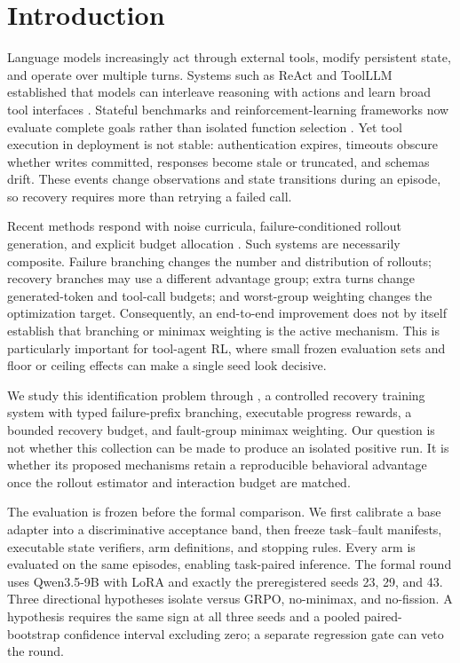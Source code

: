 \section{Introduction}
\label{sec:introduction}

Language models increasingly act through external tools, modify persistent
state, and operate over multiple turns.  Systems such as ReAct and ToolLLM
established that models can interleave reasoning with actions and learn broad
tool interfaces \citep{yao2023react,qin2024toolllm}.  Stateful benchmarks and
reinforcement-learning frameworks now evaluate complete goals rather than
isolated function selection
\citep{yao2024taubench,barres2025tau2bench,jiang2025verltool,chai2025rlfactory,xi2025agentgymrl}.
Yet tool execution in deployment is not stable: authentication expires,
timeouts obscure whether writes committed, responses become stale or
truncated, and schemas drift.  These events change observations and state
transitions during an episode, so recovery requires more than retrying a
failed call.

Recent methods respond with noise curricula, failure-conditioned rollout
generation, and explicit budget allocation
\citep{chen2026noisyagent,zhang2026fissiongrpo,hu2026infotree}.  Such systems
are necessarily composite.  Failure branching changes the number and
distribution of rollouts; recovery branches may use a different advantage
group; extra turns change generated-token and tool-call budgets; and
worst-group weighting changes the optimization target.  Consequently, an
end-to-end improvement does not by itself establish that branching or
minimax weighting is the active mechanism.  This is particularly important
for tool-agent RL, where small frozen evaluation sets and floor or ceiling
effects can make a single seed look decisive.

We study this identification problem through \method{}, a controlled recovery
training system with typed failure-prefix branching, executable progress
rewards, a bounded recovery budget, and fault-group minimax weighting.  Our
question is not whether this collection can be made to produce an isolated
positive run.  It is whether its proposed mechanisms retain a reproducible
behavioral advantage once the rollout estimator and interaction budget are
matched.

The evaluation is frozen before the formal comparison.  We first calibrate a
base adapter into a discriminative acceptance band, then freeze task--fault
manifests, executable state verifiers, arm definitions, and stopping rules.
Every arm is evaluated on the same episodes, enabling task-paired inference.
The formal round uses Qwen3.5-9B with LoRA and exactly the preregistered seeds
23, 29, and 43.  Three directional hypotheses isolate \method{} versus GRPO,
no-minimax, and no-fission.  A hypothesis requires the same sign at all three
seeds and a pooled paired-bootstrap confidence interval excluding zero; a
separate regression gate can veto the round.

